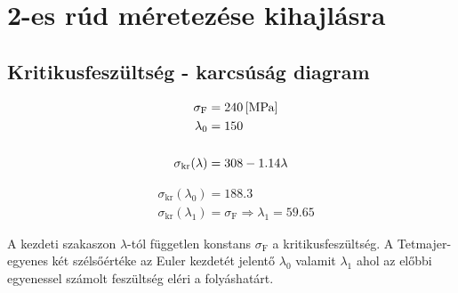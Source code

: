 \section{2-es rúd méretezése kihajlásra}

\subsection{Kritikusfeszültség - karcsúság diagram}

\begin{align*}
	\sigma_\text{F} &= \SI{240}{[\mega\pascal]} \\
	\lambda_0 &= 150 \\ \\
	\sigma_\text{kr}(\lambda) &= 308 - 1.14\lambda
\end{align*}

\begin{align*}
	&\sigma_\text{kr}(\lambda_0) = 188.3 \\
	&\sigma_\text{kr}(\lambda_1) = \sigma_\text{F} \Rightarrow \lambda_1 = 59.65
\end{align*}

A kezdeti szakaszon $\lambda$-tól független konstans $\sigma_\text{F}$ a kritikusfeszültség. A Tetmajer-egyenes két szélsőértéke az Euler kezdetét jelentő $\lambda_0$ valamit $\lambda_1$ ahol az előbbi egyenessel számolt feszültség eléri a folyáshatárt.
\begin{center}
\end{center}

